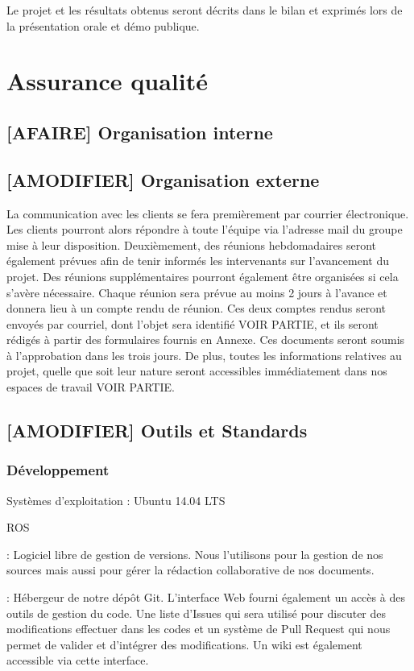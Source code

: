 \documentclass[10pt,a4paper]{article}
\begin{document}
Le projet et les résultats obtenus seront décrits dans le bilan et exprimés lors de la présentation orale et démo publique. 


\section{Assurance qualité}

\subsection{[AFAIRE] Organisation interne}

\subsection{[AMODIFIER] Organisation externe}

La communication avec les clients se fera premièrement par courrier électronique. Les clients pourront alors répondre à toute l’équipe via l’adresse mail du groupe mise à leur disposition. Deuxièmement, des réunions hebdomadaires seront également prévues afin de tenir informés les intervenants sur l’avancement du projet. Des réunions supplémentaires pourront également être organisées si cela s’avère nécessaire. Chaque réunion sera prévue au moins 2 jours à l’avance et donnera lieu à un compte rendu de réunion. Ces deux comptes rendus seront envoyés par courriel, dont l’objet sera identifié VOIR PARTIE, et ils seront rédigés à partir des formulaires fournis en Annexe. Ces documents seront soumis à l’approbation dans les trois jours. De plus, toutes les informations relatives au projet, quelle que soit leur nature seront accessibles immédiatement dans nos espaces de travail VOIR PARTIE.

\subsection{[AMODIFIER] Outils et Standards}

\subsubsection{Développement}
\begin{description}
\item * Systèmes d'exploitation : Ubuntu 14.04 LTS
\item * ROS
\item [Git] : Logiciel libre de gestion de versions. Nous l'utilisons pour la gestion de nos sources mais aussi pour gérer la rédaction collaborative de nos documents.
\item [Github] : Hébergeur de notre dépôt Git. L'interface Web fourni également un accès à des outils de gestion du code. Une liste d'Issues qui sera utilisé pour discuter des modifications effectuer dans les codes et un système de Pull Request qui nous permet de valider et d'intégrer des modifications. Un wiki est également accessible via cette interface.
\end{description}
\end{document}
